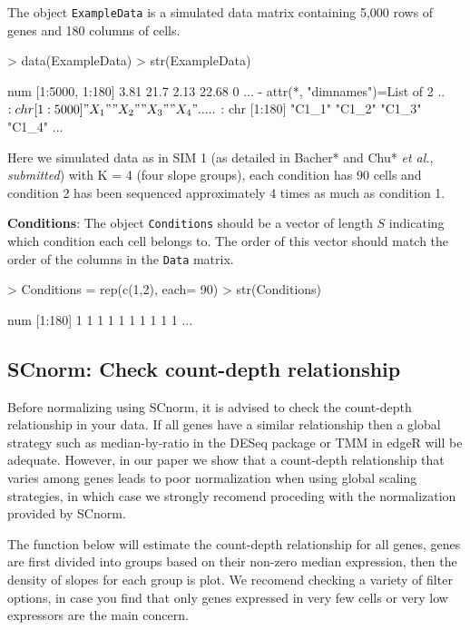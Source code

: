 \documentclass{article}
\begin{document}
\noindent The object \verb+ExampleData+ is a simulated data matrix containing
5,000 rows of genes and 180 columns of cells. 

\begin{Schunk}
\begin{Sinput}
> data(ExampleData)
> str(ExampleData)
\end{Sinput}
\begin{Soutput}
 num [1:5000, 1:180] 3.81 21.7 2.13 22.68 0 ...
 - attr(*, "dimnames")=List of 2
  ..$ : chr [1:5000] "X_1" "X_2" "X_3" "X_4" ...
  ..$ : chr [1:180] "C1_1" "C1_2" "C1_3" "C1_4" ...
\end{Soutput}
\end{Schunk}
  
  Here we simulated data as in SIM 1 (as detailed in Bacher* and Chu* {\it et al.}, {\it{submitted}}) with K = 4 (four slope groups), each condition has 90 cells and condition 2 has been 
sequenced approximately 4 times as much as condition 1.

{\bf Conditions}: The object \verb+Conditions+ should be a vector of length $S$ indicating which condition each cell belongs to. The order of this vector should match the order of the columns in the \verb+Data+ matrix.
\begin{Schunk}
\begin{Sinput}
> Conditions = rep(c(1,2), each= 90)
> str(Conditions)
\end{Sinput}
\begin{Soutput}
 num [1:180] 1 1 1 1 1 1 1 1 1 1 ...
\end{Soutput}
\end{Schunk}
  
  
  
  \subsection{SCnorm: Check count-depth relationship}
\label{sec:checkData}
Before normalizing using SCnorm, it is advised to check the count-depth relationship in your data. If all genes have a similar relationship then a global strategy such as median-by-ratio in the DESeq package or TMM in edgeR will be adequate. However, in our paper we show that a count-depth relationship that varies among genes leads to poor normalization when using global scaling strategies, in which case we strongly recomend proceding with the normalization provided by SCnorm. 

The function below will estimate the count-depth relationship for all genes, genes are first divided into groups based on their non-zero median expression, then the density of slopes for each group is plot. We recomend checking a variety of filter options, in case you find that only genes expressed in very few cells or very low expressors are the main concern.
\end{document}
